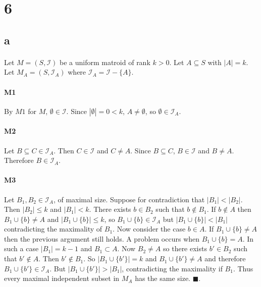 \documentclass[letterpaper,12pt,oneside,onecolumn]{report}
\begin{document}
\section*{6}
\subsection*{a}
\paragraph{}
Let $M = (S,\mathcal{I})$ be a uniform matroid of rank $k > 0$. Let $A \subseteq S$ with $|A| = k$. Let $M_A = (S, \mathcal{I}_A)$ where $\mathcal{I}_A = \mathcal{I} - \{A\}$.
\paragraph{M1}
By $M1$ for $M$, $\emptyset \in \mathcal{I}$. Since $|\emptyset| = 0 < k$, $A \neq \emptyset$, so $\emptyset \in \mathcal{I}_A$.
\paragraph{M2}
Let $B \subseteq C \in \mathcal{I}_A$. Then $C \in \mathcal{I}$ and $C \neq A$. Since $B \subseteq C$, $B \in \mathcal{I}$ and $B \neq A$. Therefore $B \in \mathcal{I}_A$.
\paragraph{M3}
Let $B_1, B_2 \in \mathcal{I}_A$, of maximal size. Suppose for contradiction that $|B_1| < |B_2|$. Then $|B_2| \leq k$ and $|B_1| < k$. There exists $b \in B_2$ such that $b \not\in B_1$. If $b \not \in A$ then $B_1 \cup \{b\} \neq A$ and $|B_1 \cup \{b\}| \leq k$, so $B_1 \cup \{b\} \in \mathcal{I}_A$ but $|B_1 \cup \{b\}| < |B_1|$ contradicting the maximality of $B_1$. Now consider the case $b \in A$. If $B_1 \cup \{b\} \neq A$ then the previous argument still holds. A problem occurs when $B_1 \cup \{b\} = A$. In such a case $|B_1| = k-1$ and $B_1 \subset A$. Now $B_2 \neq A$ so there exists $b' \in B_2$ such that $b' \not\in A$. Then $b' \not\in B_1$. So $|B_1 \cup \{b'\}| = k$ and $B_1 \cup \{b'\} \neq A$ and therefore $B_1 \cup \{b'\} \in \mathcal{I}_A$. But $|B_1 \cup \{b'\}| > |B_1|$, contradicting the maximality if $B_1$. Thus every maximal independent subset in $M_A$ has the same size. $\blacksquare$.
\end{document}
